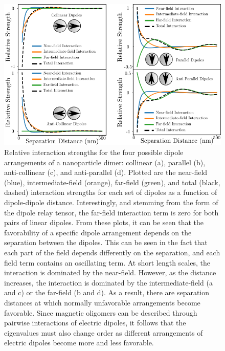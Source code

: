 \documentclass[journal=ancac3,manuscript=article]{achemso}
\begin{document}
\begin{figure}
\centering
\includegraphics{dimer_interaction.png}
\caption{Relative interaction strengths for the four possible dipole arrangements of a nanoparticle dimer: collinear (a), parallel (b), anti-collinear (c), and anti-parallel (d). Plotted are the near-field (blue), intermediate-field (orange), far-field (green), and total (black, dashed) interaction strengths for each set of dipoles as a function of dipole-dipole distance. Interestingly, and stemming from the form of the dipole relay tensor, the far-field interaction term is zero for both pairs of linear dipoles. From these plots, it can be seen that the favorability of a specific dipole arrangement depends on the separation between the dipoles. This can be seen in the fact that each part of the field depends differently on the separation, and each field term contains an oscillating term. At short length scales, the interaction is dominated by the near-field. However, as the distance increases, the interaction is dominated by the intermediate-field (a and c) or the far-field (b and d). As a result, there are separation distances at which normally unfavorable arrangements become favorable. Since magnetic oligomers can be described through pairwise interactions of electric dipoles, it follows that the eigenvalues must also change order as different arrangements of electric dipoles become more and less favorable.}
\label{fig:dimers}
\end{figure}




\end{document}
